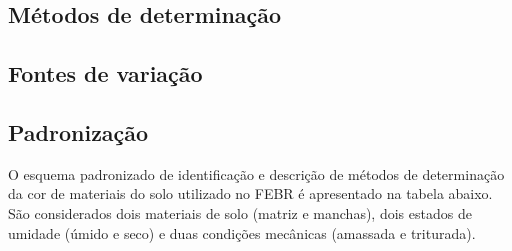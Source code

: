 \documentclass[a4paper,dvipsnames]{tufte-book}
\begin{document}
\subsection{Métodos de
determinação}\label{muxe9todos-de-determinauxe7uxe3o}

\subsection{Fontes de variação}\label{fontes-de-variauxe7uxe3o}

\subsection{Padronização}\label{padronizauxe7uxe3o}

O esquema padronizado de identificação e descrição de métodos de
determinação da cor de materiais do solo utilizado no FEBR é apresentado
na tabela abaixo. São considerados dois materiais de solo (matriz e
manchas), dois estados de umidade (úmido e seco) e duas condições
mecânicas (amassada e triturada).
\end{document}
